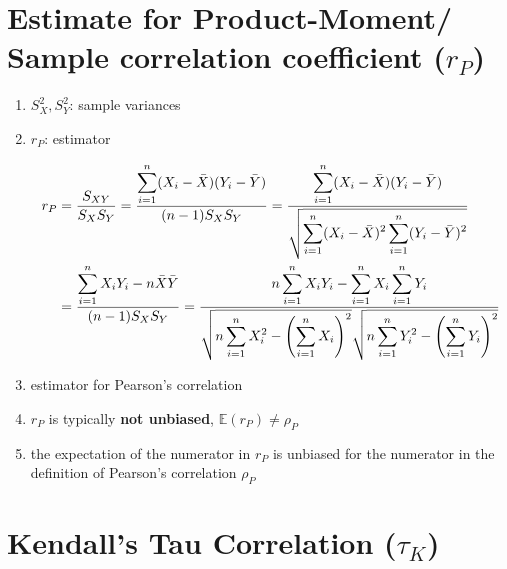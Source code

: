 \section{Estimate for Product-Moment/ Sample correlation coefficient ($r_P$) \cite{ism-1}} \label{Multivariate Distributions: Estimate for Product-Moment/ Sample correlation coefficient}

\begin{enumerate}
    \item[] $S_X^2 , S_Y^2$: sample variances
    \item[] $r_P$: estimator

    \begin{align*}
        r_P
        &= \dfrac{S_{XY}}{S_X S_Y}
        = \dfrac{
            \displaystyle\sum_{i=1}^{n} (X_i - \bar{X})(Y_i - \bar{Y})
        }{(n-1)S_X S_Y}
        = \dfrac{
            \displaystyle\sum_{i=1}^{n} (X_i - \bar{X})(Y_i - \bar{Y})
        }{\sqrt{
            \displaystyle\sum_{i=1}^{n} (X_i - \bar{X})^2
            \displaystyle\sum_{i=1}^{n} (Y_i - \bar{Y})^2
        }}\\
        &= \dfrac{
            \displaystyle\sum_{i=1}^{n} X_iY_i - 
            n\bar{X}\bar{Y}
        }{(n-1)S_X S_Y}
        = \dfrac{
            n\displaystyle\sum_{i=1}^n X_iY_i - \displaystyle\sum_{i=1}^n X_i \displaystyle\sum_{i=1}^n Y_i
        }{\sqrt{
            n\displaystyle\sum_{i=1}^{n} X_i^2 - \left(\displaystyle\sum_{i=1}^{n} X_i\right)^2
        }\sqrt{
            n\displaystyle\sum_{i=1}^{n} Y_i^2 - \left(\displaystyle\sum_{i=1}^{n} Y_i\right)^2
        }}
    \end{align*}

    \item estimator for Pearson’s correlation

    \item $r_P$ is typically \textbf{not unbiased}, $\mathbb{E}(r_P) \neq \rho_P$
    
    \item the expectation of the numerator in $r_P$ is unbiased for the numerator in the definition of Pearson’s correlation $\rho_P$
\end{enumerate}



\section{Kendall’s Tau Correlation ($\tau_K$) \cite{ism-1}} \label{Multivariate Distributions: Kendall’s Tau Correlation}


